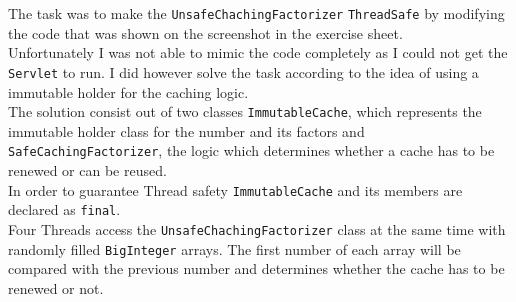 \documentclass{article}
\begin{document}
    The task was to make the \texttt{UnsafeChachingFactorizer} \texttt{ThreadSafe} by modifying the code that was shown on the screenshot in the exercise sheet. \\
    Unfortunately I was not able to mimic the code completely as I could not get the \texttt{Servlet} to run. I did however solve the task according to the idea of using a immutable holder for the caching logic. \\
    The solution consist out of two classes \texttt{ImmutableCache}, which represents the immutable holder class for the number and its factors and \texttt{SafeCachingFactorizer}, the logic which determines whether a cache has to be renewed or can be reused. \\
    In order to guarantee Thread safety \texttt{ImmutableCache} and its members are declared as \texttt{final}. \\
    Four Threads access the \texttt{UnsafeChachingFactorizer} class at the same time with randomly filled \texttt{BigInteger} arrays. The first number of each array will be compared with the previous number and determines whether the cache has to be renewed or not.
\end{document}
